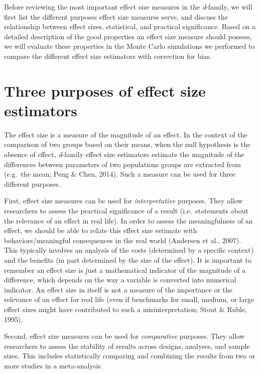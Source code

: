 \documentclass[
  english,
  man,floatsintext]{apa6}
\begin{document}
Before reviewing the most important effect size measures in the \emph{d}-family, we will first list the different purposes effect size measures serve, and discuss the relationship between effect sizes, statistical, and practical significance. Based on a detailed description of the good properties an effect size measure should possess, we will evaluate these properties in the Monte Carlo simulations we performed to compare the different effect size estimators with correction for bias.

\hypertarget{three-purposes-of-effect-size-estimators}{%
\section{Three purposes of effect size estimators}\label{three-purposes-of-effect-size-estimators}}

The effect size is a measure of the magnitude of an effect. In the context of the comparison of two groups based on their means, when the null hypothesis is the absence of effect, \emph{d}-family effect size estimators estimate the magnitude of the differences between parameters of two populations groups are extracted from (e.g.~the mean; Peng \(\&\) Chen, 2014). Such a measure can be used for three different purposes.

First, effect size measures can be used for \emph{interpretative} purposes. They allow researchers to assess the practical significance of a result (i.e.~statements about the relevance of an effect in real life). In order to assess the meaningfulness of an effect, we should be able to relate this effect size estimate with behaviors/meaningful consequences in the real world (Andersen et al., 2007). This typically involves an analysis of the costs (determined by a specific context) and the benefits (in part determined by the size of the effect). It is important to remember an effect size is just a mathematical indicator of the magnitude of a difference, which depends on the way a variable is converted into numerical indicator. An effect size in itself is not a measure of the importance or the relevance of an effect for real life (even if benchmarks for small, medium, or large effect sizes might have contributed to such a misinterpretation; Stout
\(\&\) Ruble, 1995).

Second, effect size measures can be used for \emph{comparative} purposes. They allow researchers to assess the stability of results across designs, analyses, and sample sizes. This includes statistically comparing and combining the results from two or more studies in a meta-analysis.
\end{document}
